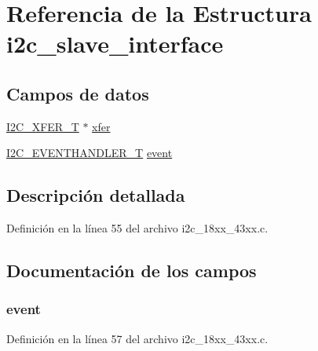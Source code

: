 \hypertarget{structi2c__slave__interface}{}\section{Referencia de la Estructura i2c\+\_\+slave\+\_\+interface}
\label{structi2c__slave__interface}
\subsection*{Campos de datos}
\begin{DoxyCompactItemize}
\item 
\hyperlink{struct_i2_c___x_f_e_r___t}{I2\+C\+\_\+\+X\+F\+E\+R\+\_\+T} $\ast$ \hyperlink{structi2c__slave__interface_a3d13ba449bbd99670d3599a6eda5f4ec}{xfer}
\item 
\hyperlink{group___i2_c__18_x_x__43_x_x_gaef152f4dc1487d90573810007489082e}{I2\+C\+\_\+\+E\+V\+E\+N\+T\+H\+A\+N\+D\+L\+E\+R\+\_\+T} \hyperlink{structi2c__slave__interface_ad2f1d9556fb723c26ff61cea60e1b7fe}{event}
\end{DoxyCompactItemize}


\subsection{Descripción detallada}


Definición en la línea 55 del archivo i2c\+\_\+18xx\+\_\+43xx.\+c.



\subsection{Documentación de los campos}
\subsubsection[{\texorpdfstring{event}{event}}]{ event}\hypertarget{structi2c__slave__interface_ad2f1d9556fb723c26ff61cea60e1b7fe}{}\label{structi2c__slave__interface_ad2f1d9556fb723c26ff61cea60e1b7fe}


Definición en la línea 57 del archivo i2c\+\_\+18xx\+\_\+43xx.\+c.

